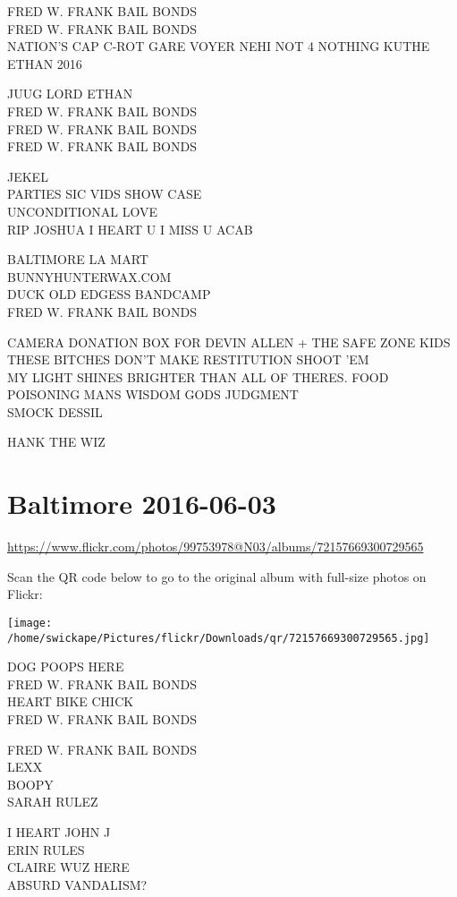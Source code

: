 \documentclass[10pt,letterpaper]{article}
\begin{document}
FRED W. FRANK BAIL BONDS\\
FRED W. FRANK BAIL BONDS\\
NATION'S CAP C{-}ROT GARE VOYER NEHI NOT 4 NOTHING KUTHE\\
ETHAN 2016

JUUG LORD ETHAN\\
FRED W. FRANK BAIL BONDS\\
FRED W. FRANK BAIL BONDS\\
FRED W. FRANK BAIL BONDS

JEKEL\\
PARTIES SIC VIDS SHOW CASE\\
UNCONDITIONAL LOVE\\
RIP JOSHUA I HEART U I MISS U ACAB

BALTIMORE LA MART\\
BUNNYHUNTERWAX.COM\\
DUCK OLD EDGESS BANDCAMP\\
FRED W. FRANK BAIL BONDS

CAMERA DONATION BOX FOR DEVIN ALLEN + THE SAFE ZONE KIDS\\
THESE BITCHES DON'T MAKE RESTITUTION SHOOT 'EM\\
MY LIGHT SHINES BRIGHTER THAN ALL OF THERES.  FOOD POISONING MANS WISDOM GODS JUDGMENT\\
SMOCK DESSIL

HANK THE WIZ


\section*{Baltimore 2016-06-03}

\url{https://www.flickr.com/photos/99753978@N03/albums/72157669300729565}

Scan the QR code below to go to the original album with full-size photos on Flickr:

\texttt{[image: /home/swickape/Pictures/flickr/Downloads/qr/72157669300729565.jpg]}


DOG POOPS HERE\\
FRED W. FRANK BAIL BONDS\\
HEART BIKE CHICK\\
FRED W. FRANK BAIL BONDS

FRED W. FRANK BAIL BONDS\\
LEXX\\
BOOPY\\
SARAH RULEZ

I HEART JOHN J\\
ERIN RULES\\
CLAIRE WUZ HERE\\
ABSURD VANDALISM?
\end{document}
